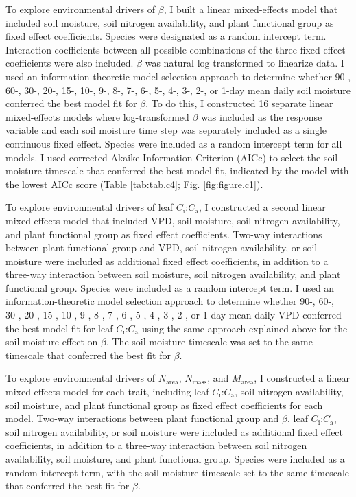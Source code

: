To explore environmental drivers of $\beta$, I built a linear mixed-effects model that included soil moisture, soil nitrogen availability, and plant functional group as fixed effect coefficients. Species were designated as a random intercept term. Interaction coefficients between all possible combinations of the three fixed effect coefficients were also included. $\beta$ was natural log transformed to linearize data. I used an information-theoretic model selection approach to determine whether 90-, 60-, 30-, 20-, 15-, 10-, 9-, 8-, 7-, 6-, 5-, 4-, 3-, 2-, or 1-day mean daily soil moisture conferred the best model fit for $\beta$. To do this, I constructed 16 separate linear mixed-effects models where log-transformed $\beta$ was included as the response variable and each soil moisture time step was separately included as a single continuous fixed effect. Species were included as a random intercept term for all models. I used corrected Akaike Information Criterion (AICc) to select the soil moisture timescale that conferred the best model fit, indicated by the model with the lowest AICc score (Table \ref{tab:tab.c4}; Fig. \ref{fig:figure.c1}).

To explore environmental drivers of leaf $C_\mathrm{i}$:$C_\mathrm{a}$, I constructed a second linear mixed effects model that included VPD, soil moisture, soil nitrogen availability, and plant functional group as fixed effect coefficients. Two-way interactions between plant functional group and VPD, soil nitrogen availability, or soil moisture were included as additional fixed effect coefficients, in addition to a three-way interaction between soil moisture, soil nitrogen availability, and plant functional group. Species were included as a random intercept term. I used an information-theoretic model selection approach to determine whether 90-, 60-, 30-, 20-, 15-, 10-, 9-, 8-, 7-, 6-, 5-, 4-, 3-, 2-, or 1-day mean daily VPD conferred the best model fit for leaf $C_\mathrm{i}$:$C_\mathrm{a}$ using the same approach explained above for the soil moisture effect on $\beta$. The soil moisture timescale was set to the same timescale that conferred the best fit for $\beta$.

To explore environmental drivers of $N_\mathrm{area}$, $N_\mathrm{mass}$, and $M_\mathrm{area}$, I constructed a linear mixed effects model for each trait, including leaf $C_\mathrm{i}$:$C_\mathrm{a}$, soil nitrogen availability, soil moisture, and plant functional group as fixed effect coefficients for each model. Two-way interactions between plant functional group and $\beta$, leaf $C_\mathrm{i}$:$C_\mathrm{a}$, soil nitrogen availability, or soil moisture were included as additional fixed effect coefficients, in addition to a three-way interaction between soil nitrogen availability, soil moisture, and plant functional group. Species were included as a random intercept term, with the soil moisture timescale set to the same timescale that conferred the best fit for $\beta$.

